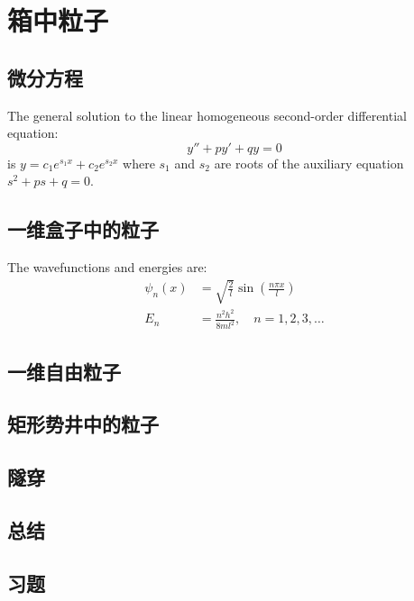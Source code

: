 \chapter{箱中粒子}
\section{微分方程}
The general solution to the linear homogeneous second-order differential equation:
\begin{equation}
	y'' + py' + qy = 0
\end{equation}
is $y = c_1 e^{s_1 x} + c_2 e^{s_2 x}$ where $s_1$ and $s_2$ are roots of the auxiliary equation $s^2 + ps + q = 0$.

\section{一维盒子中的粒子}
The wavefunctions and energies are:
\begin{align}
	\psi_n(x) &= \sqrt{\frac{2}{l}} \sin\left(\frac{n\pi x}{l}\right) \\
	E_n &= \frac{n^2 h^2}{8ml^2}, \quad n = 1,2,3,\ldots
\end{align}


\section{一维自由粒子}

\section{矩形势井中的粒子}

\section{隧穿}

\section*{总结}

\section*{习题}
